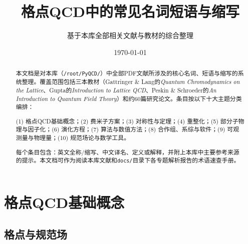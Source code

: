 \documentclass[12pt,a4paper]{ctexart}
\title{\heiti 格点QCD中的常见名词短语与缩写}
\author{基于本库全部相关文献与教材的综合整理}
\date{\today}
\begin{document}
\maketitle

\begin{abstract}
\noindent
本文档是对本库（\texttt{/root/PyQCD/}）中全部PDF文献所涉及的核心名词、短语与缩写的系统整理。覆盖范围包括三本教材（Gattringer \& Lang的\textit{Quantum Chromodynamics on the Lattice}、Gupta的\textit{Introduction to Lattice QCD}、Peskin \& Schroeder的\textit{An Introduction to Quantum Field Theory}）和约60篇研究论文。条目按以下十大主题分类编排：

(1) 格点QCD基础概念；(2) 费米子方案；(3) 对称性与定理；(4) 重整化；(5) 部分子物理与因子化；(6) 演化方程；(7) 算法与数值方法；(8) 合作组、系综与软件；(9) 可观测量与物理量；(10) 规范场论与数学工具。

每个条目包含：英文全称/缩写、中文译名、定义或解释，并附上本库中主要参考来源的提示。本文档可作为阅读本库文献和\texttt{docs/}目录下各专题解析报告的术语速查手册。
\end{abstract}

\tableofcontents
\newpage

\section{格点QCD基础概念}

\subsection*{格点与规范场}
\end{document}
